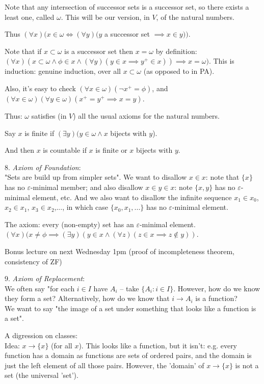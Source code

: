 \documentclass[a4paper]{article}
\begin{document}
Note that any intersection of successor sets is a successor set, so there exists a least one, called $\omega$. This will be our version, in $V$, of the natural numbers.

Thus $(\forall x)(x \in \omega \iff (\forall y)(y$ a successor set $\implies x \in y))$.

Note that if $x \subset \omega$ is a successor set then $x=\omega$ by definition:\\
$(\forall x)(x \subset \omega \wedge \phi \in x \wedge (\forall y)(y \in x \implies y^+ \in x)) \implies x=\omega)$. This is induction: genuine induction, over all $x \subset \omega$ (as opposed to in PA).

Also, it's easy to check $(\forall x \in \omega) (\neg x^+ = \phi)$, and $(\forall x \in \omega)(\forall y \in \omega)(x^+ = y^+ \implies x=y)$.

Thus: $\omega$ satisfies (in $V$) all the usual axioms for the natural numbers.

Say $x$ is finite if $(\exists y) (y \in \omega \wedge x$ bijects with $y$).

And then $x$ is countable if $x$ is finite or $x$ bijects with $y$.

8. \emph{Axiom of Foundation}:\\
"Sets are build up from simpler sets". We want to disallow $x \in x$: note that $\{x\}$ has no $\varepsilon$-minimal member; and also disallow $x \in y \in x$: note $\{x,y\}$ has no $\varepsilon$-minimal element, etc. And we also want to disallow the infinite sequence $x_1 \in x_0$, $x_2 \in x_1$, $x_3 \in x_2$,..., in which case $\{x_0,x_1,...\}$ has no $\varepsilon$-minimal element.

The axiom: every (non-empty) set has an $\varepsilon$-minimal element.\\
$(\forall x) (x \neq \phi \implies (\exists y) (y \in x \wedge (\forall z) (z \in x \implies z \not\in y))$.

Bonus lecture on next Wednesday 1pm (proof of incompleteness theorem, consistency of ZF)

9. \emph{Axiom of Replacement}:\\
We often say "for each $i \in I$ have $A_i$ -- take $\{A_i: i \in I\}$. However, how do we know they form a set? Alternatively, how do we know that $i \to A_i$ is a function?\\
We want to say "the image of a set under something that looks like a function is a set".

A digression on classes:\\
Idea: $x \to \{x\}$ (for all $x$). This looks like a function, but it isn't: e.g. every function has a domain as functions are sets of ordered pairs, and the domain is just the left element of all those pairs. However, the 'domain' of $x \to \{x\}$ is not a set (the universal 'set').
\end{document}
